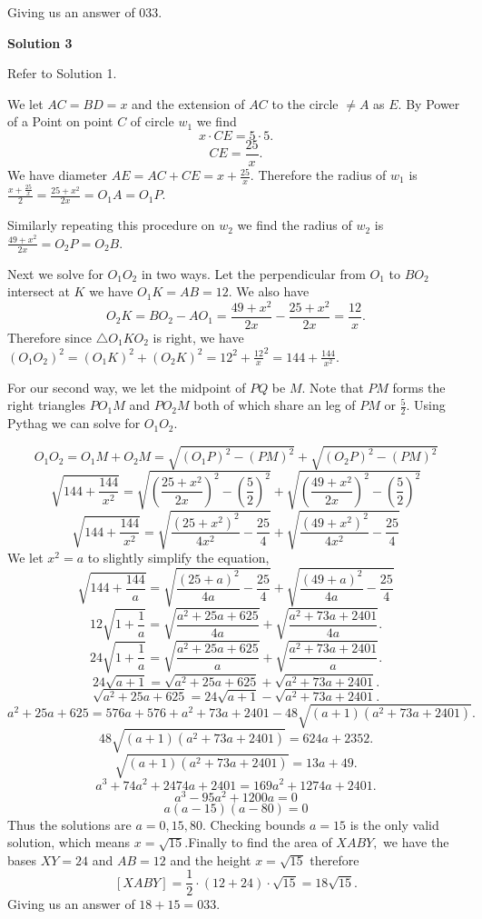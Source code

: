 \begin{enumerate}
 Giving us an answer of $\boxed{033}$.

 



\textbf{Solution 3}

Refer to Solution 1.

 We let $AC=BD=x$ and the extension of $AC$ to the circle $\neq A$ as $E.$ By Power of a Point on point $C$ of circle $w_1$ we find 
 \[x\cdot{CE}=5\cdot5.\] 
 \[CE=\frac{25}{x}.\] We have diameter $AE = AC+CE=x+\frac{25}{x}.$ Therefore the radius of $w_1$ is $\frac{x+\frac{25}{x}}{2}=\frac{25+x^2}{2x} = O_1A = O_1P.$

 Similarly repeating this procedure on $w_2$ we find the radius of $w_2$ is $\frac{49+x^2}{2x} = O_2P = O_2B.$

 Next we solve for $O_1O_2$ in two ways. Let the perpendicular from $O_1$ to $BO_2$ intersect at $K$ we have $O_1K =AB = 12.$ We also have 
 \[O_2K = BO_2 - AO_1 =\frac{49+x^2}{2x}- \frac{25+x^2}{2x}=\frac{12}{x}.\]Therefore since $\triangle{O_1KO_2}$ is right, we have $(O_1O_2)^2 = (O_1K)^2+(O_2K)^2 = 12^2 + \frac{12}{x}^2 =144 + \frac{144}{x^2}.$

 For our second way, we let the midpoint of $PQ$ be $M.$ Note that $PM$ forms the right triangles $PO_1M$ and $PO_2M$ both of which share an leg of $PM$ or $\frac{5}{2}.$ Using Pythag we can solve for $O_1O_2.$

 \[O_1O_2 = O_1M+O_2M = \sqrt{(O_1P)^2 - (PM)^2}+\sqrt{(O_2P)^2 - (PM)^2}\]
 \[\sqrt{144 + \frac{144}{x^2}} = \sqrt{(\frac{25+x^2}{2x})^2 - (\frac{5}{2})^2}+\sqrt{(\frac{49+x^2}{2x})^2 - (\frac{5}{2})^2}\]
 \[\sqrt{144 + \frac{144}{x^2}} = \sqrt{\frac{(25+x^2)^2}{4x^2} - \frac{25}{4}}+\sqrt{\frac{(49+x^2)^2}{4x^2} - \frac{25}{4}}\]We let $x^2 = a$ to slightly simplify the equation,
 \[\sqrt{144 + \frac{144}{a}} = \sqrt{\frac{(25+a)^2}{4a} - \frac{25}{4}}+\sqrt{\frac{(49+a)^2}{4a} - \frac{25}{4}}\]
 \[12\sqrt{1+\frac{1}{a}} = \sqrt{\frac{a^2 + 25a + 625}{4a}} + \sqrt{\frac{a^2 +73a + 2401}{4a}}.\]
 \[24\sqrt{1+\frac{1}{a}} = \sqrt{\frac{a^2 + 25a + 625}{a}} + \sqrt{\frac{a^2 +73a + 2401}{a}}.\]
 \[24\sqrt{a+1} = \sqrt{a^2 + 25a + 625} + \sqrt{a^2 +73a + 2401}.\]
 \[\sqrt{a^2 + 25a + 625}=24\sqrt{a+1}-\sqrt{a^2 +73a + 2401}.\]
 \[a^2 + 25a + 625=576a+576+a^2+73a+2401-48\sqrt{(a+1)(a^2 +73a + 2401)}.\]
 \[48\sqrt{(a+1)(a^2 +73a + 2401)}=624a+2352.\]
 \[\sqrt{(a+1)(a^2 +73a + 2401)}=13a+49.\]
 \[a^3 + 74 a^2 + 2474 a + 2401=169 a^2 + 1274 a + 2401.\]
 \[a^3 -95a^2 + 1200a = 0\]
 \[a(a-15)(a-80)=0\]Thus the solutions are $a=0,15,80.$ Checking bounds $a=15$ is the only valid solution, which means $x=\sqrt{15}.$Finally to find the area of $XABY,$ we have the bases $XY=24$ and $AB=12$ and the height $x=\sqrt{15}$ therefore 
 \[[XABY]=\frac{1}{2}\cdot(12+24)\cdot\sqrt{15}=18\sqrt{15}.\]Giving us an answer of $18+15 = \boxed{033}.$




\end{enumerate}

